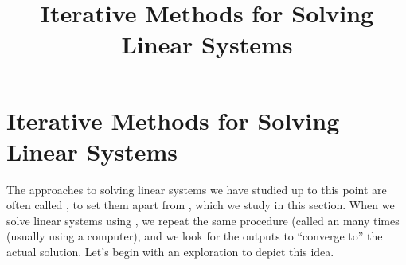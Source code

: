 \documentclass{ximera}
\title{Iterative Methods for Solving Linear Systems} \license{CC BY-NC-SA 4.0}
\begin{document}
\begin{abstract}

\end{abstract}
\maketitle
\section*{Iterative Methods for Solving Linear Systems}

The approaches to solving linear systems we have studied up to this point are often called , to set them apart from , which we study in this section.  When we solve linear systems using , we repeat the same procedure (called an  many times (usually using a computer), and we look for the outputs to ``converge to'' the actual solution.  Let's begin with an exploration to depict this idea.
\end{document}
